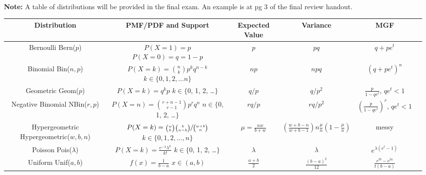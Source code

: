 \documentclass[10pt,landscape]{article}
\begin{document}
\begin{center}

\textbf{Note:} A table of distributions will be provided in the final exam. An example is at pg 3 of the final review handout.
\renewcommand{\arraystretch}{3.7}
\begin{tabular}{cccccc}
\textbf{Distribution} & \textbf{PMF/PDF and Support} & \textbf{Expected Value}  & \textbf{Variance} & \textbf{MGF}\\
\hline 
\shortstack{Bernoulli \\ Bern($p$)} & \shortstack{$P(X=1) = p$ \\$ P(X=0) = q=1-p$} & $p$ & $pq$ & $q + pe^t$ \\
\hline
\shortstack{Binomial \\ Bin($n, p$)} & \shortstack{$P(X=k) = {n \choose k}p^k q^{n-k}$  \\ $k \in \{0, 1, 2, \dots n\}$}& $np$ & $npq$ & $(q + pe^t)^n$ \\
\hline
\shortstack{Geometric \\ Geom($p$)} & \shortstack{$P(X=k) = q^kp$  \\ $k \in \{$0, 1, 2, \dots $\}$}& $q/p$ & $q/p^2$ & $\frac{p}{1-qe^t}, \, qe^t < 1$\\
\hline
\shortstack{Negative Binomial \\ NBin($r, p$)} & \shortstack{$P(X=n) = {r + n - 1 \choose r -1}p^rq^n$ \\ $n \in \{$0, 1, 2, \dots $\}$} & $rq/p$ & $rq/p^2$ &  $(\frac{p}{1-qe^t})^r, \, qe^t < 1$\\
\hline
\shortstack{Hypergeometric \\ Hypergeometric($w, b, n$)} & \shortstack{$P(X=k) = \sfrac{{w \choose k}{b \choose n-k}}{{w + b \choose n}}$ \\ $k \in \{0, 1, 2, \dots,  n\}$} & $\mu = \frac{nw}{b+w}$ &$\left(\frac{w+b-n}{w+b-1} \right) n\frac{\mu}{n}(1 - \frac{\mu}{n})$& messy  \\
\hline
\shortstack{Poisson \\ Pois($\lambda$)} & \shortstack{$P(X=k) = \frac{e^{-\lambda}\lambda^k}{k!}$ \\ $k \in \{$0, 1, 2, \dots $\}$} & $\lambda$ & $\lambda$ & $e^{\lambda(e^t-1)}$ \\
\hline
\hline
\shortstack{Uniform \\ Unif($a, b$)} & \shortstack{$ f(x) = \frac{1}{b-a}$ \\$ x \in (a, b) $} & $\frac{a+b}{2}$ & $\frac{(b-a)^2}{12}$ &  $\frac{e^{tb}-e^{ta}}{t(b-a)}$\\

\end{tabular}
\end{center}
\end{document}
